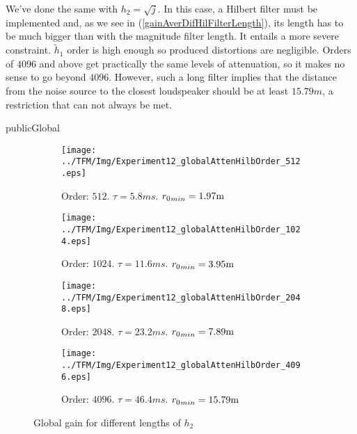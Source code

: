 We've done the same with $h_2 = \sqrt{j}$. In this case, a Hilbert filter must be implemented and, as we see in (\autoref{gainAverDifHilFilterLength}), its length has to be much bigger than with the magnitude filter length. It entails a more severe constraint. $\widetilde{h}_1$ order is high enough so produced distortions are negligible. Orders of $4096$ and above get practically the same levels of attenuation, so it makes no sense to go beyond $4096$. However, such a long filter implies that the distance from the noise source to the closest loudspeaker should be at least $15.79 \si{m}$, a restriction that can not always be met.
\begin{shownto}{publicGlobal}
\begin{figure}[h]
	\centering
	\begin{subfigure}[b]{0.45\textwidth}
		\centering
		\texttt{[image: ../TFM/Img/Experiment12\_globalAttenHilbOrder\_512.eps]}
		\caption{Order: $512$. $\tau = 5.8 \si{ms}$. ${\distLinePrimSource}_{min} = 1.97\si{m}$}
	\end{subfigure}
	\begin{subfigure}[b]{0.45\textwidth}
		\centering
		\texttt{[image: ../TFM/Img/Experiment12\_globalAttenHilbOrder\_1024.eps]}
		\caption{Order: $1024$. $\tau = 11.6 \si{ms}$. ${\distLinePrimSource}_{min} = 3.95\si{m}$}
	\end{subfigure}
	\begin{subfigure}[b]{0.45\textwidth}
		\centering
		\texttt{[image: ../TFM/Img/Experiment12\_globalAttenHilbOrder\_2048.eps]}
		\caption{Order: $2048$. $\tau = 23.2 \si{ms}$. ${\distLinePrimSource}_{min} = 7.89\si{m}$}
	\end{subfigure}
	\begin{subfigure}[b]{0.45\textwidth}
		\centering
		\texttt{[image: ../TFM/Img/Experiment12\_globalAttenHilbOrder\_4096.eps]}
		\caption{Order: $4096$. $\tau = 46.4 \si{ms}$. ${\distLinePrimSource}_{min} = 15.79\si{m}$}
	\end{subfigure}
	
	\caption{Global gain for different lengths of $h_2$}
	\label{globCancDifHilFilterLength}
\end{figure}
\end{shownto}

